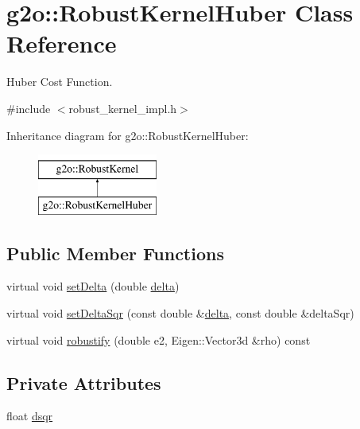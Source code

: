 \hypertarget{classg2o_1_1_robust_kernel_huber}{}\section{g2o\+:\+:Robust\+Kernel\+Huber Class Reference}
\label{classg2o_1_1_robust_kernel_huber}


Huber Cost Function.  




{\ttfamily \#include $<$robust\+\_\+kernel\+\_\+impl.\+h$>$}

Inheritance diagram for g2o\+:\+:Robust\+Kernel\+Huber\+:\begin{figure}[H]
\begin{center}
\leavevmode
\includegraphics[height=2.000000cm]{classg2o_1_1_robust_kernel_huber}
\end{center}
\end{figure}
\subsection*{Public Member Functions}
\begin{DoxyCompactItemize}
\item 
virtual void \mbox{\hyperlink{classg2o_1_1_robust_kernel_huber_a7e9ee4bbc9483dcd3d10a4c1f506a4d2}{set\+Delta}} (double \mbox{\hyperlink{classg2o_1_1_robust_kernel_affb1dacfd8507540281ff3af2ae6eeb8}{delta}})
\item 
virtual void \mbox{\hyperlink{classg2o_1_1_robust_kernel_huber_ad243b5888d71a3573e9f9372abead870}{set\+Delta\+Sqr}} (const double \&\mbox{\hyperlink{classg2o_1_1_robust_kernel_affb1dacfd8507540281ff3af2ae6eeb8}{delta}}, const double \&delta\+Sqr)
\item 
virtual void \mbox{\hyperlink{classg2o_1_1_robust_kernel_huber_aa437e8a62360ba63b56b383aac8e4674}{robustify}} (double e2, Eigen\+::\+Vector3d \&rho) const
\end{DoxyCompactItemize}
\subsection*{Private Attributes}
\begin{DoxyCompactItemize}
\item 
float \mbox{\hyperlink{classg2o_1_1_robust_kernel_huber_ada9d48b59d64f72c18b11905de8dca0d}{dsqr}}
\end{DoxyCompactItemize}
